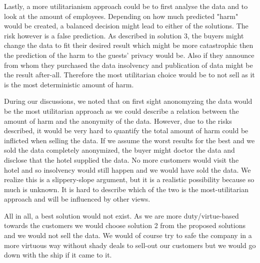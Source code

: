Lastly, a more utilitarianism approach could be to first analyse the data and to look at the amount of employees. Depending on how much predicted "harm" would be created, a balanced decision might lead to either of the solutions. The risk however is a false prediction. As described in solution 3, the buyers might change the data to fit their desired result which might be more catastrophic then the prediction of the harm to the guests' privacy would be. Also if they announce from whom they purchased the data insolvency and publication of data might be the result after-all. Therefore the most utilitarian choice would be to not sell as it is the most deterministic amount of harm.

During our discussions, we noted that on first sight anonomyzing the data would be the most utilitarian approach as we could describe a relation between the amount of harm and the anonymity of the data. However, due to the risks described, it would be very hard to quantify the total amount of harm could be inflicted when selling the data. If we assume the worst results for the best and we sold the data completely anonymized, the buyer might doctor the data and disclose that the hotel supplied the data. No more customers would visit the hotel and so insolvency would still happen and we would have sold the data. We realize this is a slippery-slope argument, but it is a realistic possibility because so much is unknown. It is hard to describe which of the two is the most-utilitarian approach and will be influenced by other views.

All in all, a best solution would not exist. As we are more duty/virtue-based towards the customers we would choose solution 2 from the proposed solutions and we would not sell the data. We would of course try to safe the company in a more virtuous way without shady deals to sell-out our customers but we would go down with the ship if it came to it.
